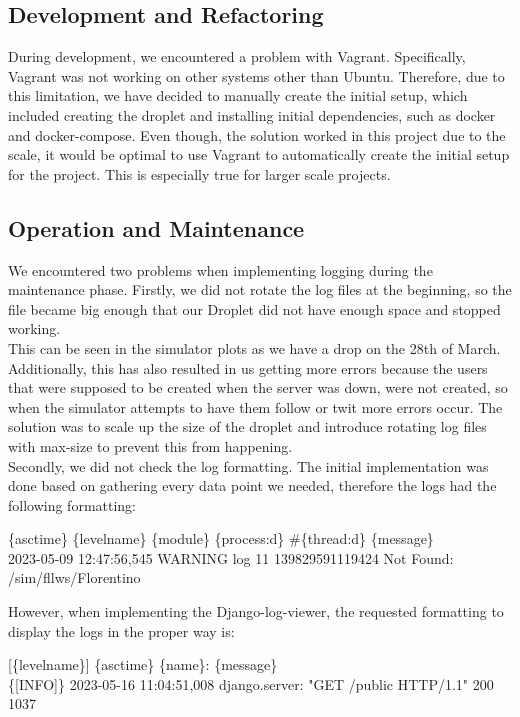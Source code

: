 \subsection*{Development and Refactoring}

During development, we encountered a problem with Vagrant. Specifically, Vagrant was not working on other systems other than Ubuntu. Therefore, due to this limitation, we have decided to manually create the initial setup, which included creating the droplet and installing initial dependencies, such as docker and docker-compose. Even though, the solution worked in this project due to the scale, it would be optimal to use Vagrant to automatically create the initial setup for the project. This is especially true for larger scale projects.

\subsection*{Operation and Maintenance}

We encountered two problems when implementing logging during the maintenance phase. Firstly, we did not rotate the log files at the beginning, so the file became big enough that our Droplet did not have enough space and stopped working.\\
This can be seen in the simulator plots as we have a drop on the 28th of March. Additionally, this has also resulted in us getting more errors because the users that were supposed to be created when the server was down, were not created, so when the simulator attempts to have them follow or twit more errors occur. The solution was to scale up the size of the droplet and introduce rotating log files with max-size to prevent this from happening.\\
Secondly, we did not check the log formatting. The initial implementation was done based on gathering every data point we needed, therefore the logs had the following formatting:
\begin{center}
    \{asctime\} \{levelname\} \{module\} \{process:d\} \#\{thread:d\} \{message\}\\
    2023-05-09 12:47:56,545 WARNING log 11 139829591119424 Not Found: /sim/fllws/Florentino
\end{center}
However, when implementing the Django-log-viewer, the requested formatting to display the logs in the proper way is:

\begin{center}
    [\{levelname\}] \{asctime\} \{name\}: \{message\}\\
    \{[INFO]\} 2023-05-16 11:04:51,008 django.server: "GET /public HTTP/1.1" 200 1037
\end{center}

